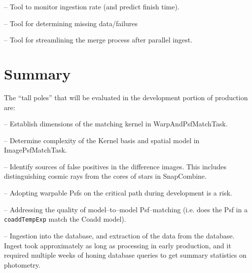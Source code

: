 \documentclass[prd, nofootinbib, floatfix, 11pt,tightenlines,times]{article}
\begin{document}
-- Tool to monitor ingestion rate (and predict finish time).

-- Tool for determining missing data/failures

-- Tool for streamlining the merge process after parallel ingest.


\section{Summary} 

The ``tall poles'' that will be evaluated in the development portion of production are:

-- Establish dimensions of the matching kernel in WarpAndPsfMatchTask.

-- Determine complexity of the Kernel basis and spatial model in
ImagePsfMatchTask.

-- Identify sources of false positives in the difference images.  This
includes distinguishing cosmic rays from the cores of stars in
SnapCombine.

-- Adopting  warpable Psfs on the critical path during
development is a risk.

-- Addressing the quality of model--to--model Psf--matching (i.e. does
the Psf in a {\tt coaddTempExp} match the Coadd model).
 
-- Ingestion into the database, and extraction of the data from the
database.  Ingest took approximately as long as processing in early
production, and it required multiple weeks of honing database queries
to get summary statistics on photometry.


\clearpage 
\end{document}
